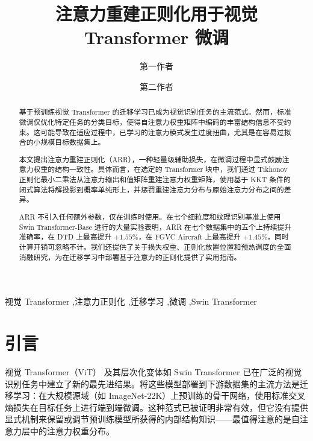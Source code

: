 \documentclass[preprint,12pt]{elsarticle}
\begin{document}
\begin{frontmatter}

\title{注意力重建正则化用于视觉 Transformer 微调}

\author[inst1]{第一作者}
\author[inst1]{第二作者}


\begin{abstract}
基于预训练视觉 Transformer 的迁移学习已成为视觉识别任务的主流范式。然而，标准微调仅优化特定任务的分类目标，使得自注意力权重矩阵中编码的丰富结构信息不受约束。这可能导致在适应过程中，已学习的注意力模式发生过度扭曲，尤其是在容易过拟合的小规模目标数据集上。

本文提出注意力重建正则化（ARR），一种轻量级辅助损失，在微调过程中显式鼓励注意力权重的结构一致性。具体而言，在选定的 Transformer 块中，我们通过 Tikhonov 正则化最小二乘法从注意力输出和值矩阵重建注意力权重矩阵，使用基于 KKT 条件的闭式算法将解投影到概率单纯形上，并惩罚重建注意力分布与原始注意力分布之间的差异。

ARR 不引入任何额外参数，仅在训练时使用。在七个细粒度和纹理识别基准上使用 Swin Transformer-Base 进行的大量实验表明，ARR 在七个数据集中的五个上持续提升准确率，在 DTD 上最高提升 $+1.55\%$，在 FGVC Aircraft 上最高提升 $+1.45\%$，同时计算开销可忽略不计。我们还提供了关于损失权重、正则化放置位置和预热调度的全面消融研究，为在迁移学习中部署基于注意力的正则化提供了实用指南。
\end{abstract}

\begin{keyword}
视觉 Transformer \sep 注意力正则化 \sep 迁移学习 \sep 微调 \sep Swin Transformer
\end{keyword}

\end{frontmatter}

\section{引言}

视觉 Transformer（ViT）\cite{dosovitskiy2021image} 及其层次化变体如 Swin Transformer \cite{liu2021swin} 已在广泛的视觉识别任务中建立了新的最先进结果。将这些模型部署到下游数据集的主流方法是迁移学习：在大规模源域（如 ImageNet-22K）上预训练的骨干网络，使用标准交叉熵损失在目标任务上进行端到端微调。这种范式已被证明非常有效，但它没有提供显式机制来保留或调节预训练模型所获得的内部结构知识——最值得注意的是自注意力层中的注意力权重分布。
\end{document}
